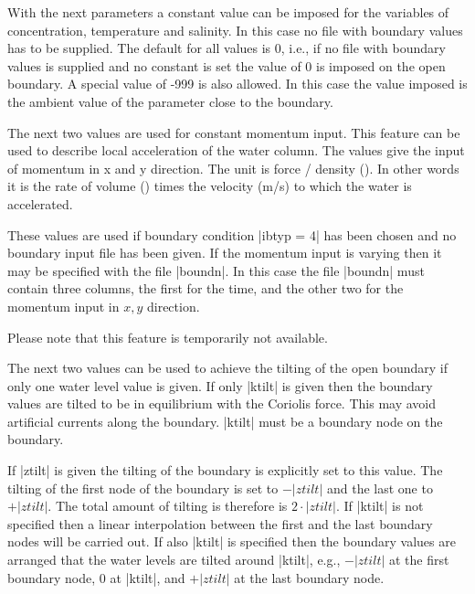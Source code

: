 With the next parameters a constant value can be imposed for the 
variables of concentration, temperature and salinity. In this case
no file with boundary values has to be supplied. The default for all
values is 0, i.e., if no file with boundary values is supplied and
no constant is set the value of 0 is imposed on the open boundary.
A special value of -999 is also allowed. In this case the value
imposed is the ambient value of the parameter close to the boundary.

\par

The next two values are used for constant momentum input. 
This feature can be used to describe local acceleration of the
water column. The values give the input of momentum 
in x and y direction. The unit is force / density (\maccelunit).
In other words it is the rate of volume (\dischargeunit) times
the velocity (m/s) to which the water is accelerated.

These values are used if 
boundary condition |ibtyp = 4| has been chosen and
no boundary input file has been given.
If the momentum input is varying then it may be specified with
the file |boundn|. In this case the file |boundn| must contain
three columns, the first for the time, and the other two for
the momentum input in $x,y$ direction.

Please note that this feature is temporarily not available.

\par

The next two values can be used
to achieve the tilting of the open boundary if only one water level value
is given. If only |ktilt| is given then the boundary values
are tilted to be in equilibrium with the Coriolis force. This may avoid
artificial currents along the boundary. |ktilt| must be a boundary node
on the boundary.

If |ztilt| is given the tilting of the boundary is explicitly set
to this value. The tilting of the first node of the boundary is set 
to $-|ztilt|$
and the last one to $+|ztilt|$. The total amount of tilting is
therefore is $2 \cdot |ztilt|$. If |ktilt| is not specified
then a linear interpolation between the first and the last boundary
nodes will be carried out. If also |ktilt| is specified then
the boundary values are arranged that the water levels are 
tilted around |ktilt|, e.g., $-|ztilt|$ at the first boundary node,
0 at |ktilt|, and $+|ztilt|$ at the last boundary node.


